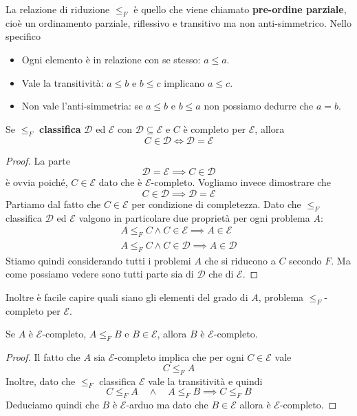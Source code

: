 La relazione di riduzione $\leq_F$ è quello che viene chiamato
\textbf{pre-ordine parziale}, cioè un ordinamento parziale,
riflessivo e transitivo ma non anti-simmetrico. Nello specifico
\begin{itemize}
	\item Ogni elemento è in relazione con se stesso: $a \leq a$.
	\item Vale la transitività: $a \leq b$ e $b \leq c$ implicano
	      $a \leq c$.
	\item Non vale l'anti-simmetria: se $a \leq b$ e $b \leq a$
	      non possiamo dedurre che $a = b$.
\end{itemize}

\begin{property}
	Se $\leq_F$ \textbf{classifica} $\mathcal{D}$ ed $\mathcal{E}$
	con $\mathcal{D} \subseteq \mathcal{E}$ e $C$ è completo per
	$\mathcal{E}$, allora
	\[ C \in \mathcal{D} \iff \mathcal{D} = \mathcal{E} \]
	\begin{proof}
		La parte
		\[ \mathcal{D} = \mathcal{E} \implies C \in \mathcal{D} \]
		è ovvia poiché, $C \in \mathcal{E}$ dato che è
		$\mathcal{E}$-completo.
		Vogliamo invece dimostrare che
		\[ C \in \mathcal{D} \implies \mathcal{D} = \mathcal{E} \]
		Partiamo dal fatto che $C \in \mathcal{E}$ per condizione
		di completezza. Dato che $\leq_F$ classifica
		$\mathcal{D}$ ed $\mathcal{E}$ valgono in particolare
		due proprietà per ogni problema $A$:
		\begin{gather*}
			A \leq_F C \land C \in \mathcal{E} \implies A \in \mathcal{E} \\
			A \leq_F C \land C \in \mathcal{D} \implies A \in \mathcal{D}
		\end{gather*}
		Stiamo quindi considerando tutti i problemi $A$ che si
		riducono a $C$ secondo $F$. Ma come possiamo vedere sono
		tutti parte sia di $\mathcal{D}$ che di $\mathcal{E}$.
	\end{proof}
\end{property}

Inoltre è facile capire quali siano gli elementi del grado di
$A$, problema $\leq_F$-completo per $\mathcal{E}$.

\begin{property}
	Se $A$ è $\mathcal{E}$-completo, $A \leq_F B$ e
	$B \in \mathcal{E}$, allora $B$ è $\mathcal{E}$-completo.
	\begin{proof}
		Il fatto che $A$ sia $\mathcal{E}$-completo implica che
		per ogni $C \in \mathcal{E}$ vale
		\[ C \leq_F A \]
		Inoltre, dato che $\leq_F$ classifica $\mathcal{E}$ vale
		la transitività e quindi
		\[
			C \leq_F A \quad \land \quad A \leq_F B
			\implies C \leq_F B
		\]
		Deduciamo quindi che $B$ è $\mathcal{E}$-arduo ma dato
		che $B \in \mathcal{E}$ allora è $\mathcal{E}$-completo.
	\end{proof}
\end{property}

